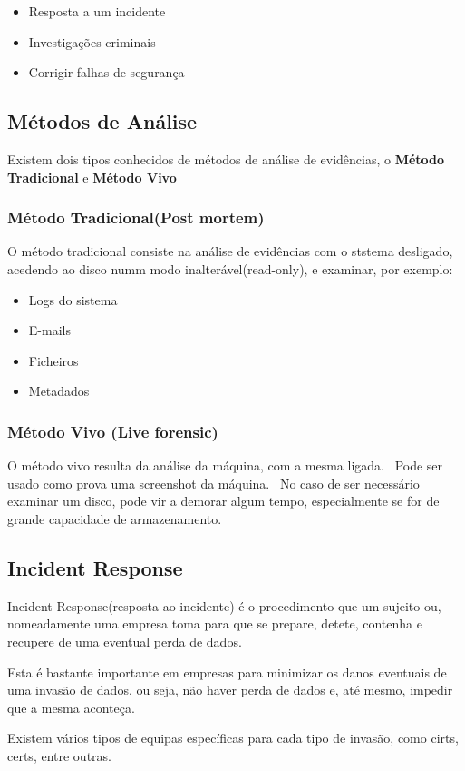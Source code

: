 \documentclass{report}
\begin{document}
\begin{itemize}
    \item Resposta a um incidente
    \item Investigações criminais
    \item Corrigir falhas de segurança
\end{itemize}

\subsection{Métodos de Análise}
\label{subsec:metodos-de-analise}
Existem dois tipos conhecidos de métodos de análise de evidências, o \textbf{Método Tradicional} e \textbf{Método Vivo}

\subsubsection{Método Tradicional(Post mortem)}
O método tradicional consiste na análise de evidências com o ststema desligado, acedendo ao disco numm modo inalterável(read-only), e examinar, por exemplo:
\begin{itemize}
    \item Logs do sistema
    \item E-mails
    \item Ficheiros
    \item Metadados
\end{itemize}

\subsubsection{Método Vivo (Live forensic)}
O método vivo resulta da análise da máquina, com a mesma ligada. \ Pode ser usado como prova uma screenshot da máquina. \ No caso de ser necessário examinar um disco, pode vir a demorar algum tempo, especialmente se for de grande capacidade de armazenamento.

\newpage

\subsection{Incident Response}
\label{subsec:incident-response}
Incident Response(resposta ao incidente) é o procedimento que um sujeito ou, nomeadamente uma empresa toma para que se prepare, detete, contenha e recupere de uma eventual perda de dados. \par
Esta é bastante importante em empresas para minimizar os danos eventuais de uma invasão de dados, ou seja, não haver perda de dados e, até mesmo, impedir que a mesma aconteça. \par
Existem vários tipos de equipas específicas para cada tipo de invasão, como \ac{cirts}, \ac{certs}, entre outras.
\end{document}
